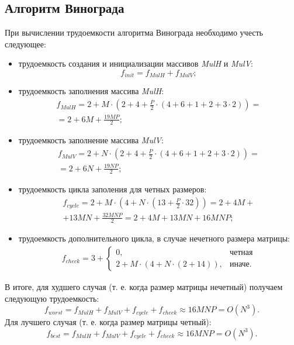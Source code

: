\subsection{Алгоритм Винограда}
При вычислении трудоемкости алгоритма Винограда необходимо учесть следующее:
\begin{itemize}
	\item трудоемкость создания и инициализации массивов \textit{MulH} и \textit{MulV}:
	\begin{equation}
		f_{init} = f_{MulH} + f_{MulV};
	\end{equation}
	\item трудоемкость заполнения массива \textit{MulH}:
	\begin{equation}
		\begin{gathered}
		f_{MulH} = 2 + M \cdot (2 + 4 + \frac{P}{2} \cdot (4 + 6 + 1 + 2 + 3 \cdot 2)) = \\
		= 2 + 6M + \frac{19MP}{2};
		\end{gathered}
	\end{equation}
	\item трудоемкость заполнение массива \textit{MulV}:
	\begin{equation}
		\begin{gathered}
		f_{MulV} = 2 + N \cdot (2 + 4 + \frac{P}{2} \cdot (4 + 6 + 1 + 2 + 3 \cdot 2)) = \\
		= 2 + 6N + \frac{19NP}{2};
		\end{gathered}
	\end{equation}
	\item трудоемкость цикла заполения для четных размеров:
	\begin{equation}
		\begin{gathered}
			f_{cycle} = 2 + M \cdot (4 + N \cdot (13 + \frac{P}{2} \cdot 32)) = 2 + 4M + \\
			+ 13MN + \frac{32MNP}{2}  = 2 + 4M + 13MN + 16MNP;
		\end{gathered}
	\end{equation}
	\item трудоемкость дополнительного цикла, в случае нечетного размера матрицы:
	\begin{equation}
		\begin{gathered}
			f_{check} = 3 + 
			\begin{cases}
				0, & \text{четная} \\
				2 + M \cdot (4 + N \cdot (2 + 14)), & \text{иначе}.
			\end{cases}
		\end{gathered}  
	\end{equation}
\end{itemize}
В итоге, для худшего случая (т. е. когда размер матрицы нечетный) получаем следующую трудоемкость:
\begin{equation}
	f_{worst} = f_{MulH} + f_{MulV} + f_{cycle} + f_{check} \approx 16MNP = O(N^3).
\end{equation}
Для лучшего случая (т. е. когда размер матрицы четный):
\begin{equation}
	f_{best} = f_{MulH} + f_{MulV} + f_{cycle} + f_{check} \approx 16MNP = O(N^3).
\end{equation}

